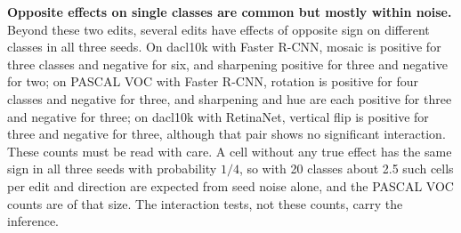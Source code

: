 \documentclass[conference]{IEEEtran}
\begin{document}
\noindent\textbf{Opposite effects on single classes are common but mostly within noise.} Beyond these two edits, several edits have effects of opposite sign on different classes in all three seeds. On dacl10k with Faster R-CNN, mosaic is positive for three classes and negative for six, and sharpening positive for three and negative for two; on PASCAL VOC with Faster R-CNN, rotation is positive for four classes and negative for three, and sharpening and hue are each positive for three and negative for three; on dacl10k with RetinaNet, vertical flip is positive for three and negative for three, although that pair shows no significant interaction. These counts must be read with care. A cell without any true effect has the same sign in all three seeds with probability $1/4$, so with 20 classes about 2.5 such cells per edit and direction are expected from seed noise alone, and the PASCAL VOC counts are of that size. The interaction tests, not these counts, carry the inference.
\end{document}
